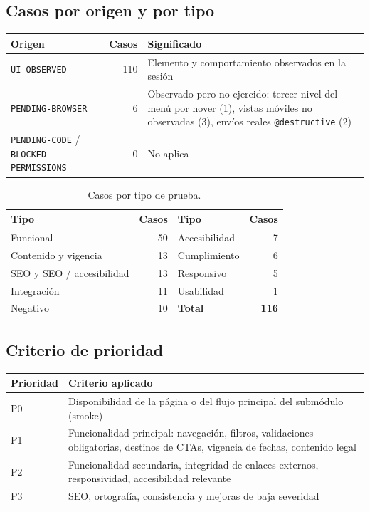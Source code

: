 \documentclass[11pt,a4paper]{article}
\newcommand{\code}[1]{\texttt{#1}}
\begin{document}
\subsection{Casos por origen y por tipo}
\begin{table}[H]
\centering\small
\begin{tabularx}{\textwidth}{@{}l r X@{}}
\toprule
Origen & Casos & Significado \\
\midrule
\code{UI-OBSERVED} & 110 & Elemento y comportamiento observados en la sesión \\
\code{PENDING-BROWSER} & 6 & Observado pero no ejercido: tercer nivel del menú por hover (1),
  vistas móviles no observadas (3), envíos reales \code{@destructive} (2) \\
\code{PENDING-CODE} / \code{BLOCKED-PERMISSIONS} & 0 & No aplica \\
\bottomrule
\end{tabularx}
\end{table}

\begin{table}[H]
\centering\small
\begin{tabular}{@{}l r @{\hspace{1.4cm}} l r@{}}
\toprule
Tipo & Casos & Tipo & Casos \\
\midrule
Funcional & 50 & Accesibilidad & 7 \\
Contenido y vigencia & 13 & Cumplimiento & 6 \\
SEO y SEO / accesibilidad & 13 & Responsivo & 5 \\
Integración & 11 & Usabilidad & 1 \\
Negativo & 10 & \textbf{Total} & \textbf{116} \\
\bottomrule
\end{tabular}
\caption{Casos por tipo de prueba.}
\end{table}

\subsection{Criterio de prioridad}
\begin{table}[H]
\centering\small
\begin{tabularx}{\textwidth}{@{}l X@{}}
\toprule
Prioridad & Criterio aplicado \\
\midrule
P0 & Disponibilidad de la página o del flujo principal del submódulo (smoke) \\
P1 & Funcionalidad principal: navegación, filtros, validaciones obligatorias, destinos de CTAs,
  vigencia de fechas, contenido legal \\
P2 & Funcionalidad secundaria, integridad de enlaces externos, responsividad, accesibilidad
  relevante \\
P3 & SEO, ortografía, consistencia y mejoras de baja severidad \\
\bottomrule
\end{tabularx}
\end{table}
\end{document}
